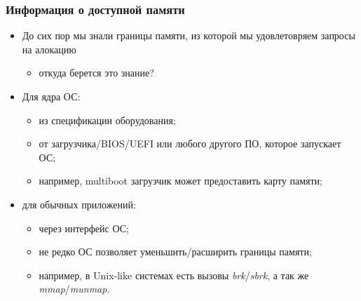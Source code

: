 \begin{frame}
\frametitle{Информация о доступной памяти}
\begin{itemize}
  \item До сих пор мы знали границы памяти, из которой мы удовлетовряем запросы
  на алокацию
  \begin{itemize}
    \item откуда берется это знание?
  \end{itemize}
  \item Для ядра ОС:
  \begin{itemize}
    \item из спецификации оборудования;
    \item от загрузчика/BIOS/UEFI или любого другого ПО, которое запускает ОС;
    \item например, multiboot загрузчик может предоставить карту памяти;
  \end{itemize}
  \item для обычных приложений:
  \begin{itemize}
    \item через интерфейс ОС;
    \item не редко ОС позволяет уменьшить/расширить границы памяти;
    \item например, в Unix-like системах есть вызовы \emph{brk}/\emph{sbrk},
    а так же \emph{mmap}/\emph{munmap}.
  \end{itemize}
\end{itemize}
\end{frame}
